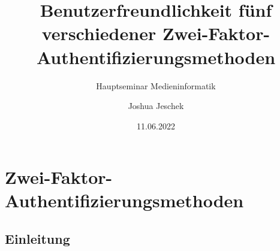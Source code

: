 
\usepackage[T1]{fontenc}
\usepackage[utf8]{inputenc}
\usepackage[ngerman]{babel}







\newcommand{\Title}{Benutzerfreundlichkeit fünf verschiedener Zwei-Faktor-Authentifizierungsmethoden}
\newcommand{\ShortTitle}{Zwei-Faktor-Authentifizierungsmethoden}
\title[\ShortTitle]{\Title}
\subtitle{Hauptseminar Medieninformatik}
\author{Joshua Jeschek}
\date{11.06.2022}



\tucthreeheadlines{}
\frame{\titlepage}

\tuctwoheadlines{}
\section*{\ShortTitle}
\subsection{Einleitung}


